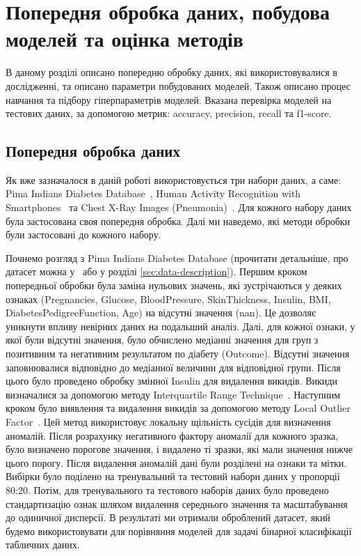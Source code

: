 \chapter{Попередня обробка даних, побудова моделей та оцінка методів}
\label{chap:practice}

В даному розділі описано попередню обробку даних, які використовувалися в дослідженні, та описано параметри побудованих моделей. Також описано процес навчання та підбору гіперпараметрів моделей. Вказана перевірка моделей на тестових даних, за допомогою метрик: accuracy, precision, recall та f1-score.

\section{Попередня обробка даних}

Як вже зазначалося в даній роботі використовується три набори даних, а саме: Pima Indians Diabetes Database~\cite{ct30}, Human Activity Recognition with Smartphones~\cite{ct31} та Chest X-Ray Images (Pneumonia)~\cite{ct32}. Для кожного набору даних була застосована своя попередня обробка. Далі ми наведемо, які методи обробки були застосовані до кожного набору.

Почнемо розгляд з Pima Indians Diabetes Database (прочитати детальніше, про датасет можна у~\cite{ct30} або у розділі \ref{sec:data-description}). Першим кроком попередньої обробки була заміна нульових значень, які зустрічаються у деяких ознаках (Pregnancies, Glucose, BloodPressure, SkinThickness, Insulin, BMI, DiabetesPedigreeFunction, Age) на відсутні значення (nan). Це дозволяє уникнути впливу невірних даних на подальший аналіз. Далі, для кожної ознаки, у якої були відсутні значення, було обчислено медіанні значення для груп з позитивним та негативним результатом по діабету (Outcome). Відсутні значення заповнювалися відповідно до медіанної величини для відповідної групи. Після цього було проведено обробку змінної Insulin для видалення викидів. Викиди визначалися за допомогою методу Interquartile Range Technique~\cite{ct33}. Наступним кроком було виявлення та видалення викидів за допомогою методу Local Outlier Factor~\cite{ct34}. Цей метод використовує локальну щільність сусідів для визначення аномалій. Після розрахунку негативного фактору аномалії для кожного зразка, було визначено порогове значення, і видалено ті зразки, які мали значення нижче цього порогу. Після видалення аномалій дані були розділені на ознаки та мітки. Вибірки було поділено на тренувальний та тестовий набори даних у пропорції 80:20. Потім, для тренувального та тестового наборів даних було проведено стандартизацію ознак шляхом видалення середнього значення та масштабування до одиничної дисперсії. В результаті ми отримали оброблений датасет, який будемо використовувати для порівняння моделей для задачі бінарної класифікації табличних даних.

